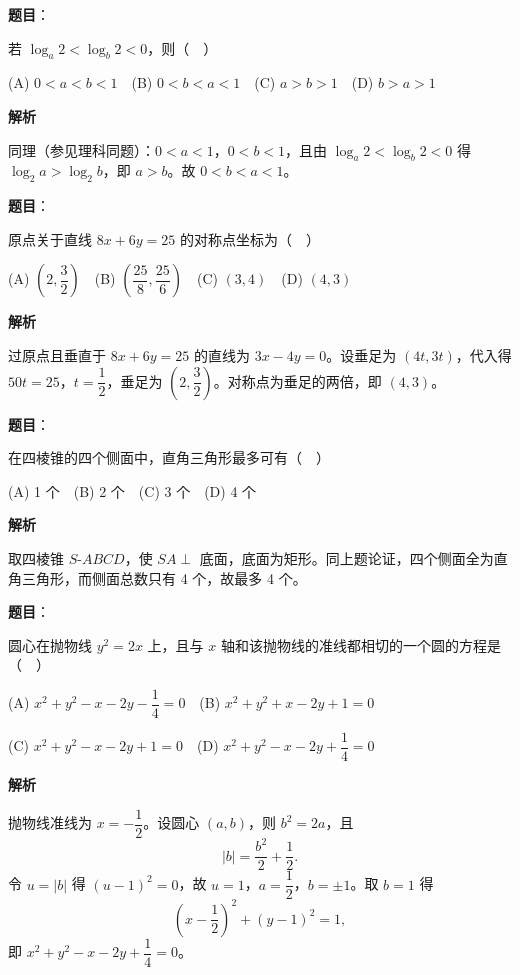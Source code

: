 \begin{answer}

\textbf{题目}：

若 \(\log_a 2<\log_b 2<0\)，则（　）

(A) \(0<a<b<1\)　(B) \(0<b<a<1\)　(C) \(a>b>1\)　(D) \(b>a>1\)

\textbf{解析}

同理（参见理科同题）：\(0<a<1\)，\(0<b<1\)，且由 \(\log_a2<\log_b2<0\) 得 \(\log_2a>\log_2b\)，即 \(a>b\)。故 \(0<b<a<1\)。


\end{answer}
\begin{answer}

\textbf{题目}：

原点关于直线 \(8x+6y=25\) 的对称点坐标为（　）

(A) \(\left(2,\dfrac{3}{2}\right)\)　(B) \(\left(\dfrac{25}{8},\dfrac{25}{6}\right)\)　(C) \((3,4)\)　(D) \((4,3)\)

\textbf{解析}

过原点且垂直于 \(8x+6y=25\) 的直线为 \(3x-4y=0\)。设垂足为 \((4t,3t)\)，代入得 \(50t=25\)，\(t=\dfrac12\)，垂足为 \(\left(2,\dfrac32\right)\)。对称点为垂足的两倍，即 \((4,3)\)。


\end{answer}
\begin{answer}

\textbf{题目}：

在四棱锥的四个侧面中，直角三角形最多可有（　）

(A) 1 个　(B) 2 个　(C) 3 个　(D) 4 个

\textbf{解析}

取四棱锥 \(S\text{-}ABCD\)，使 \(SA\perp\) 底面，底面为矩形。同上题论证，四个侧面全为直角三角形，而侧面总数只有 4 个，故最多 4 个。


\end{answer}
\begin{answer}

\textbf{题目}：

圆心在抛物线 \(y^2=2x\) 上，且与 \(x\) 轴和该抛物线的准线都相切的一个圆的方程是（　）

(A) \(x^2+y^2-x-2y-\dfrac{1}{4}=0\)　(B) \(x^2+y^2+x-2y+1=0\)

(C) \(x^2+y^2-x-2y+1=0\)　(D) \(x^2+y^2-x-2y+\dfrac{1}{4}=0\)

\textbf{解析}

抛物线准线为 \(x=-\dfrac12\)。设圆心 \((a,b)\)，则 \(b^2=2a\)，且
\nopagebreak[4]
\[
|b|=\frac{b^2}{2}+\frac12.
\]
令 \(u=|b|\) 得 \((u-1)^2=0\)，故 \(u=1\)，\(a=\dfrac12\)，\(b=\pm1\)。取 \(b=1\) 得
\nopagebreak[4]
\[
\left(x-\frac12\right)^2+(y-1)^2=1,
\]
即 \(x^2+y^2-x-2y+\dfrac14=0\)。


\end{answer}
